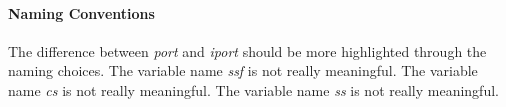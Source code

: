 \paragraph{Naming Conventions}
\begin{itemize}
		\begin{itemize}
				The difference between \textit{port} and \textit{iport} should be more highlighted through the naming choices.
				The variable name \textit{ssf} is not really meaningful.
				The variable name \textit{cs} is not really meaningful.
				The variable name \textit{ss} is not really meaningful.
		\end{itemize}
\end{itemize}
%
